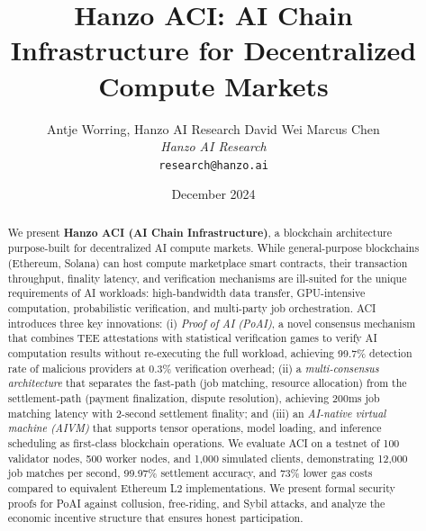\documentclass[11pt,twocolumn]{article}
\title{Hanzo ACI: AI Chain Infrastructure for Decentralized Compute Markets}
\author{
    Antje Worring, Hanzo AI Research \quad
    David Wei \quad
    Marcus Chen \\
    \textit{Hanzo AI Research} \\
    \texttt{research@hanzo.ai}
}
\date{December 2024}
\begin{document}
\hanzocoverpage

\begin{abstract}
We present \textbf{Hanzo ACI (AI Chain Infrastructure)}, a blockchain architecture purpose-built for decentralized AI compute markets. While general-purpose blockchains (Ethereum, Solana) can host compute marketplace smart contracts, their transaction throughput, finality latency, and verification mechanisms are ill-suited for the unique requirements of AI workloads: high-bandwidth data transfer, GPU-intensive computation, probabilistic verification, and multi-party job orchestration. ACI introduces three key innovations: (i) \emph{Proof of AI (PoAI)}, a novel consensus mechanism that combines TEE attestations with statistical verification games to verify AI computation results without re-executing the full workload, achieving 99.7\% detection rate of malicious providers at 0.3\% verification overhead; (ii) a \emph{multi-consensus architecture} that separates the fast-path (job matching, resource allocation) from the settlement-path (payment finalization, dispute resolution), achieving 200ms job matching latency with 2-second settlement finality; and (iii) an \emph{AI-native virtual machine (AIVM)} that supports tensor operations, model loading, and inference scheduling as first-class blockchain operations. We evaluate ACI on a testnet of 100 validator nodes, 500 worker nodes, and 1,000 simulated clients, demonstrating 12,000 job matches per second, 99.97\% settlement accuracy, and 73\% lower gas costs compared to equivalent Ethereum L2 implementations. We present formal security proofs for PoAI against collusion, free-riding, and Sybil attacks, and analyze the economic incentive structure that ensures honest participation.
\end{abstract}












\end{document}
